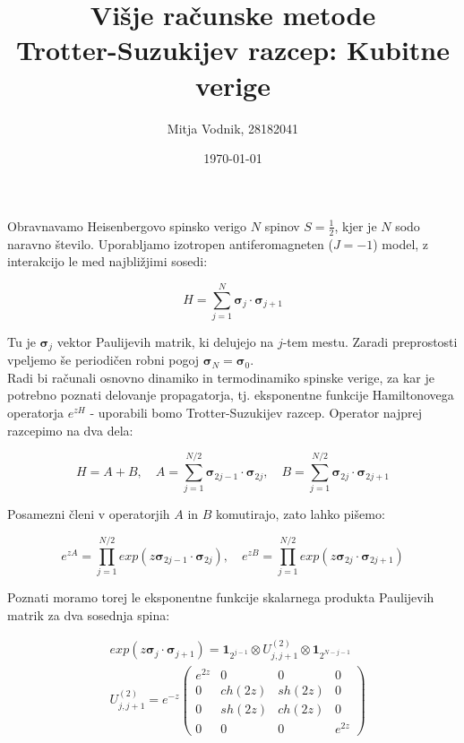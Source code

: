 \documentclass[a4paper]{article}
\newcommand{\half}{\frac{1}{2}}
\newcommand{\pauli}{\mathbf{\sigma}}
\newcommand{\id}[1]{\mathbf{1}_{2^{#1}}}
\begin{document}
    \title{\sc\large Višje računske metode\\
		\bigskip
		\bf\Large Trotter-Suzukijev razcep: Kubitne verige}
	\author{Mitja Vodnik, 28182041}
	\date{\today}
	\maketitle

    Obravnavamo Heisenbergovo spinsko verigo $N$ spinov $S = \half$, kjer je $N$ sodo naravno število.
    Uporabljamo izotropen antiferomagneten ($J = -1$) model, z interakcijo le med najbližjimi sosedi:

    \begin{equation}\label{eq1}
        H = \sum_{j=1}^{N} \pauli_j \cdot \pauli_{j+1}
    \end{equation}

    Tu je $\pauli_j$ vektor Paulijevih matrik, ki delujejo na $j$-tem mestu.
    Zaradi preprostosti vpeljemo še periodičen robni pogoj $\pauli_N = \pauli_0$.\\

    Radi bi računali osnovno dinamiko in termodinamiko spinske verige, za kar je potrebno poznati delovanje
    propagatorja, tj. eksponentne funkcije Hamiltonovega operatorja $e^{zH}$ - uporabili bomo Trotter-Suzukijev razcep.
    Operator najprej razcepimo na dva dela:

    \begin{equation}\label{eq2}
            H = A + B, \quad
            A = \sum_{j=1}^{N/2} \pauli_{2j-1} \cdot \pauli_{2j}, \quad
            B = \sum_{j=1}^{N/2} \pauli_{2j} \cdot \pauli_{2j+1}
    \end{equation}

    Posamezni členi v operatorjih $A$ in $B$ komutirajo, zato lahko pišemo:

    \begin{equation}\label{eq3}
    e^{zA} = \prod_{j=1}^{N/2} exp(z\pauli_{2j-1} \cdot \pauli_{2j}), \quad
    e^{zB} = \prod_{j=1}^{N/2} exp(z\pauli_{2j} \cdot \pauli_{2j+1})
    \end{equation}

    Poznati moramo torej le eksponentne funkcije skalarnega produkta Paulijevih matrik za dva sosednja spina:

    \begin{equation}\label{eq4}
    \begin{split}
    &exp(z\pauli_{j} \cdot \pauli_{j+1}) = \id{j-1} \otimes U_{j, j+1}^{(2)} \otimes \id{N-j-1}\\
        &U_{j, j+1}^{(2)} = e^{-z}
        \begin{pmatrix}
            e^{2z} & 0 & 0 & 0 \\
            0 & ch(2z) & sh(2z) & 0 \\
            0 & sh(2z) & ch(2z) & 0 \\
            0 & 0 & 0 & e^{2z}
        \end{pmatrix}
    \end{split}
    \end{equation}
\end{document}
